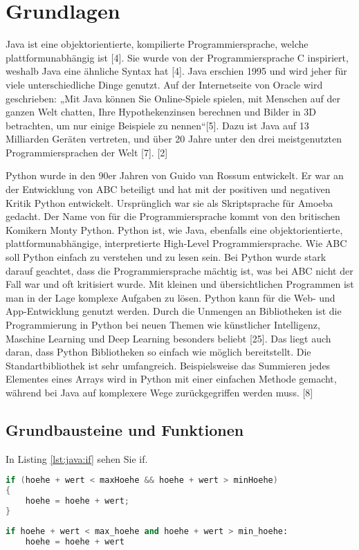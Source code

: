 \chapter{Grundlagen}

Java ist eine objektorientierte, kompilierte Programmiersprache, welche plattformunabhängig ist [4]. Sie wurde von der Programmiersprache C inspiriert, weshalb Java eine ähnliche Syntax hat [4]. Java erschien 1995 und wird jeher für viele unterschiedliche Dinge genutzt. Auf der Internetseite von Oracle wird geschrieben: „Mit Java können Sie Online-Spiele spielen, mit Menschen auf der ganzen Welt chatten, Ihre Hypothekenzinsen berechnen und Bilder in 3D betrachten, um nur einige Beispiele zu nennen“[5]. Dazu ist Java auf 13 Milliarden Geräten vertreten, und über 20 Jahre unter den drei meistgenutzten Programmiersprachen der Welt [7]. [2] \par
Python wurde in den 90er Jahren von Guido van Rossum entwickelt. Er war an der Entwicklung von ABC beteiligt und hat mit der positiven und negativen Kritik Python entwickelt. Ursprünglich war sie als Skriptsprache für Amoeba gedacht. Der Name von für die Programmiersprache kommt von den britischen Komikern Monty Python. Python ist, wie Java, ebenfalls eine objektorientierte, plattformunabhängige, interpretierte High-Level Programmiersprache. Wie ABC soll Python einfach zu verstehen und zu lesen sein. Bei Python wurde stark darauf geachtet, dass die Programmiersprache mächtig ist, was bei ABC nicht der Fall war und oft kritisiert wurde. Mit kleinen und übersichtlichen Programmen ist man in der Lage komplexe Aufgaben zu lösen. Python kann für die Web- und App-Entwicklung genutzt werden. Durch die Unmengen an Bibliotheken ist die Programmierung in Python bei neuen Themen wie künstlicher Intelligenz, Maschine Learning und Deep Learning besonders beliebt [25]. Das liegt auch daran, dass Python Bibliotheken so einfach wie möglich bereitstellt. Die Standartbibliothek ist sehr umfangreich. Beispielsweise das Summieren jedes Elementes eines Arrays wird in Python mit einer einfachen Methode gemacht, während bei Java auf komplexere Wege zurückgegriffen werden muss. [8]

\section{Grundbausteine und Funktionen}

In Listing \ref{lst:java:if} sehen Sie if.

\begin{lstlisting}[language=java,caption={If-Verzweigung in Java},captionpos=b,label={lst:java:if}]
if (hoehe + wert < maxHoehe && hoehe + wert > minHoehe)
{
    hoehe = hoehe + wert;
}
\end{lstlisting}

\begin{lstlisting}[language=python,caption={If-Verzweigung in Python},captionpos=b,label={lst:python:if}]
if hoehe + wert < max_hoehe and hoehe + wert > min_hoehe:
    hoehe = hoehe + wert
\end{lstlisting}
